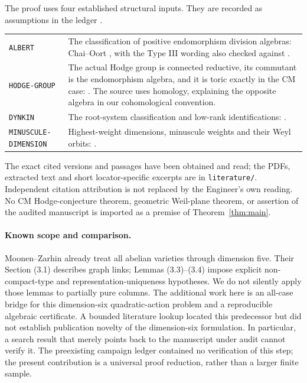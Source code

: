 \documentclass[11pt]{article}
\theoremstyle{remark}
\begin{document}
The proof uses four established structural inputs.
They are recorded as assumptions in the ledger
.
\begin{center}\small
\begin{tabular}{p{}p{}}
\texttt{ALBERT} &
The classification of positive endomorphism division algebras:
Chai--Oort \cite[Sections 10.12--10.14]{CO}, with the Type III wording
also checked against \cite[Section (1.1)]{MZ}.\\[3pt]
\texttt{HODGE-GROUP} &
The actual Hodge group is connected reductive, its commutant is the
endomorphism algebra, and it is toric exactly in the CM case:
\cite[Sections (1.2)--(1.3)]{MZ}. The source uses homology, explaining
the opposite algebra in our cohomological convention.\\[3pt]
\texttt{DYNKIN} &
The root-system classification and low-rank identifications:
\cite[Example 23.5, Theorem 23.7, Remark 23.18]{Et}.\\[3pt]
\texttt{MINUSCULE-}\newline\texttt{DIMENSION} &
Highest-weight dimensions, minuscule weights and their Weyl orbits:
\cite[Proposition 26.8, Definition 30.1, Lemma 30.2,
Corollary 30.5, Sections 27.2 and 30.4]{Et}.
\end{tabular}
\end{center}
The exact cited versions and passages have been obtained and read;
the PDFs, extracted text and short locator-specific excerpts are in
\texttt{literature/}. Independent citation attribution is not replaced
by the Engineer's own reading. No CM Hodge-conjecture theorem, geometric
Weil-plane theorem, or assertion of the audited manuscript is imported
as a premise of Theorem~\ref{thm:main}.

\paragraph{Known scope and comparison.}
Moonen--Zarhin \cite[Theorems (0.1)--(0.2)]{MZ} already treat all abelian
varieties through dimension five. Their Section (3.1) describes graph
links; Lemmas (3.3)--(3.4) impose explicit non-compact-type and
representation-uniqueness hypotheses. We do not silently apply those
lemmas to partially pure columns. The additional work here is an
all-case bridge for this dimension-six quadratic-action problem and
a reproducible algebraic certificate. A bounded literature lookup
located this predecessor but did not establish publication novelty of
the dimension-six formulation. In particular, a search result that
merely points back to the manuscript under audit cannot verify it.
The preexisting campaign ledger contained no verification of this step;
the present contribution is a universal proof reduction, rather than
a larger finite sample.
\end{document}
